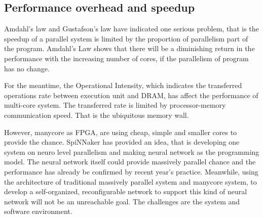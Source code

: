 \subsection{Performance overhead and speedup} 
\par Amdahl's law and Gustafson's law have indicated one serious problem, that is the speedup of a parallel system is limited by the proportion of parallelism part of the program. Amdahl's Law shows that there will be a diminishing return in the performance with the increasing number of cores, if the parallelism of program has no change\cite{hill2008amdahl}. 
\par For the meantime, the Operational Intensity, which indicates the transferred operations rate between execution unit and DRAM, has affect the performance of multi-core system\cite{williams2009roofline}. The transferred rate is limited by processor-memory communication speed. That is the ubiquitous memory wall.
\par However, manycore as FPGA, are using cheap, simple and smaller cores to provide the chance. SpiNNaker has provided an idea, that is developing one system on neuro level parallelism and making neural network as the programming model. The neural network itself could provide massively parallel chance and the performance has already be confirmed by recent year's practice. Meanwhile, using the architecture of traditional massively parallel system and manycore system, to develop a self-organized, reconfigurable network to support this kind of neural network will not be an unreachable goal. The challenges are the system and software environment.
